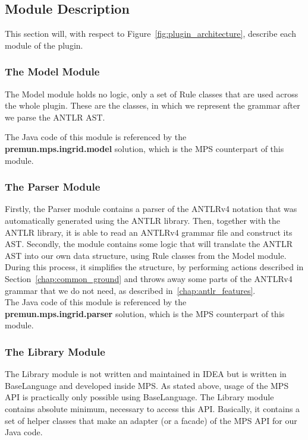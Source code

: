 \subsection{Module Description}

This section will, with respect to Figure~\ref{fig:plugin_architecture}, describe each module of the plugin.

\subsubsection{The Model Module}

The Model module holds no logic, only a set of Rule classes that are used across the whole plugin.
These are the classes, in which we represent the grammar after we parse the ANTLR AST.

The Java code of this module is referenced by the \\\textbf{premun.mps.ingrid.model} solution, which is the MPS counterpart of this module.

\subsubsection{The Parser Module}

Firstly, the Parser module contains a parser of the ANTLRv4 notation that was automatically generated using the ANTLR library.
Then, together with the ANTLR library, it is able to read an ANTLRv4 grammar file and construct its AST.
Secondly, the module contains some logic that will translate the ANTLR AST into our own data structure, using Rule classes from the Model module.
During this process, it simplifies the structure, by performing actions described in Section~\ref{chap:common_ground} and throws away some parts of the ANTLRv4 grammar that we do not need, as described in~\ref{chap:antlr_features}.
\\

The Java code of this module is referenced by the \\\textbf{premun.mps.ingrid.parser} solution, which is the MPS counterpart of this module.

\subsubsection{The Library Module}

The Library module is not written and maintained in IDEA but is written in BaseLanguage and developed inside MPS.
As stated above, usage of the MPS API is practically only possible using BaseLanguage.
The Library module contains absolute minimum, necessary to access this API.
Basically, it contains a set of helper classes that make an adapter (or a facade) of the MPS API for our Java code.
\\

